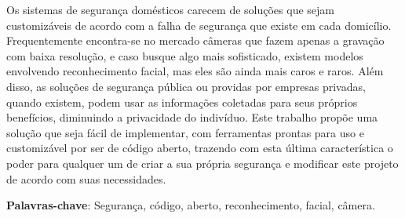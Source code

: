 \documentclass[12pt, %
openright, 
oneside, %
a4paper,    %
brazil]{facom-ufu-abntex2}
\begin{document}





\begin{resumo} %
 Os sistemas de segurança domésticos carecem de soluções
 que sejam customizáveis de acordo com a falha de segurança que existe em cada domicílio.
 Frequentemente encontra-se no mercado câmeras que fazem apenas a gravação com baixa resolução, e
 caso busque algo mais sofisticado, existem modelos envolvendo reconhecimento facial, mas eles são ainda mais caros e raros.
 Além disso, as soluções de segurança pública ou providas por empresas privadas, quando existem, podem usar as informações 
 coletadas para seus próprios benefícios, diminuindo a privacidade do indivíduo. Este trabalho propõe uma solução que seja
 fácil de implementar, com ferramentas prontas para uso e customizável por ser de código aberto,  
 trazendo com esta última característica o poder para qualquer um de criar a sua própria segurança 
 e modificar este projeto de acordo com suas necessidades. 

 \vspace{\onelineskip}
    
 \noindent
 \textbf{Palavras-chave}: Segurança, código,  aberto, reconhecimento, facial, câmera.  %
\end{resumo}

\listoffigures*
\cleardoublepage

\listoftables*
\cleardoublepage
\end{document}
